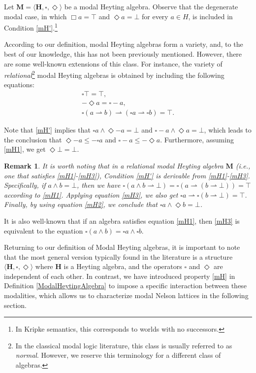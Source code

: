 \documentclass[pdflatex,sn-mathphys-num]{sn-jnl}%
\newcommand{\He}{\mathbf{H}}
\theoremstyle{thmstyleone}%
\theoremstyle{thmstyletwo}%
\newtheorem{remark}{Remark}%
\theoremstyle{thmstylethree}%
\begin{document}
Let $\mathbf{M} = \langle \He, \square, \Diamond \rangle$ be a modal Heyting algebra. Observe that the degenerate modal case, in which $\Box a = \top$ and $\Diamond a = \bot$ for every $a \in H$, is included in Condition \eqref{mH'}.\footnote{In Kripke semantics, this corresponds to worlds with no successors.}

According to our definition, modal Heyting algebras form a variety, and, to the best of our knowledge, this has not been previously mentioned. However, there are some well-known extensions of this class. For instance, the variety of \emph{relational}\footnote{In the classical modal logic literature, this class is usually referred to as \emph{normal}. However, we reserve this terminology for a different class of algebras.} modal Heyting algebras is obtained by including the following equations:
\begin{align}
    \square \top = \top, \tag{mH1} \label{mH1} \\
    -\Diamond a = \square -a, \tag{mH2} \label{mH2} \\
    \square (a \rightharpoonup b) \rightharpoonup (\square a \rightharpoonup \square b) = \top. \tag{mH3} \label{mH3}
\end{align}

Note that \eqref{mH'} implies that $\square a \wedge \Diamond -a = \bot$ and $\square -a \wedge \Diamond a = \bot$, which leads to the conclusion that $\Diamond -a \leq -\square a$ and $\square -a \leq -\Diamond a$. Furthermore, assuming \eqref{mH1}, we get $\Diamond \bot = \bot$.

\begin{remark}
It is worth noting that in a relational modal Heyting algebra $\mathbf{M}$ (i.e., one that satisfies \eqref{mH1}-\eqref{mH3}), Condition \eqref{mH'} is derivable from \eqref{mH1}-\eqref{mH3}. Specifically, if $a \wedge b = \bot$, then we have $\square (a \wedge b \rightharpoonup \bot) = \square(a \rightharpoonup (b \rightharpoonup \bot)) = \top$ according to \eqref{mH1}. Applying equation \eqref{mH3}, we also get $\square a \rightharpoonup \square(b \rightharpoonup \bot) = \top$. Finally, by using equation \eqref{mH2}, we conclude that $\square a \wedge \Diamond b = \bot$.
\end{remark}

It is also well-known that if an algebra satisfies equation \eqref{mH1}, then \eqref{mH3} is equivalent to the equation $\square (a \wedge b) = \square a \wedge \square b$.

Returning to our definition of Modal Heyting algebras, it is important to note that the most general version typically found in the literature is a structure \( \langle \He, \square, \Diamond \rangle \) where \( \He \) is a Heyting algebra, and the operators \( \square \) and \( \Diamond \) are independent of each other. In contrast, we have introduced property \eqref{mH} in Definition \ref{ModalHeytingAlgebra} to impose a specific interaction between these modalities, which allows us to characterize modal Nelson lattices in the following section.
\end{document}
